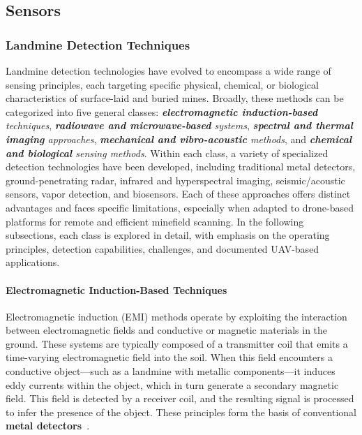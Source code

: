 \subsection{Sensors}

\subsubsection{Landmine Detection Techniques}

Landmine detection technologies have evolved to encompass a wide range of sensing principles, each targeting specific physical, chemical, or biological characteristics of surface-laid and buried mines. Broadly, these methods can be categorized into five general classes: \textit{\textbf{electromagnetic induction-based} techniques}, \textit{\textbf{radiowave and microwave-based} systems}, \textit{\textbf{spectral and thermal imaging} approaches}, \textit{\textbf{mechanical and vibro-acoustic} methods}, and \textit{\textbf{chemical and biological} sensing methods}. Within each class, a variety of specialized detection technologies have been developed, including traditional metal detectors, ground-penetrating radar, infrared and hyperspectral imaging, seismic/acoustic sensors, vapor detection, and biosensors. Each of these approaches offers distinct advantages and faces specific limitations, especially when adapted to drone-based platforms for remote and efficient minefield scanning. In the following subsections, each class is explored in detail, with emphasis on the operating principles, detection capabilities, challenges, and documented UAV-based applications.

\paragraph{Electromagnetic Induction-Based Techniques}

Electromagnetic induction (EMI) methods operate by exploiting the interaction between electromagnetic fields and conductive or magnetic materials in the ground. These systems are typically composed of a transmitter coil that emits a time-varying electromagnetic field into the soil. When this field encounters a conductive object—such as a landmine with metallic components—it induces eddy currents within the object, which in turn generate a secondary magnetic field. This field is detected by a receiver coil, and the resulting signal is processed to infer the presence of the object. These principles form the basis of conventional \textbf{metal detectors}~\cite{gichd2006guidebook}.

